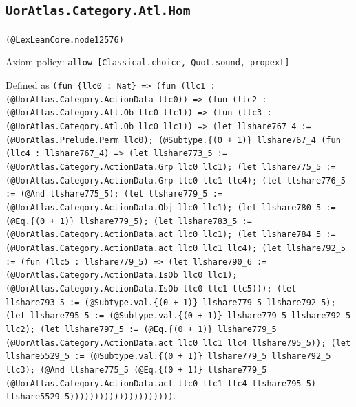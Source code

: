 \documentclass[11pt]{article}
\begin{document}
\subsection*{\texttt{UorAtlas.Category.Atl.Hom}}
\noindent\texttt{(@LexLeanCore.node12576)}\par
\noindent Axiom policy: \texttt{allow [Classical.choice, Quot.sound, propext]}.\par
\noindent Defined as \texttt{(fun \{llc0 : Nat\} => (fun (llc1 : (@UorAtlas.Category.ActionData llc0)) => (fun (llc2 : (@UorAtlas.Category.Atl.Ob llc0 llc1)) => (fun (llc3 : (@UorAtlas.Category.Atl.Ob llc0 llc1)) => (let llshare767\_4 := (@UorAtlas.Prelude.Perm llc0); (@Subtype.\{(0 + 1)\} llshare767\_4 (fun (llc4 : llshare767\_4) => (let llshare773\_5 := (@UorAtlas.Category.ActionData.Grp llc0 llc1); (let llshare775\_5 := (@UorAtlas.Category.ActionData.Grp llc0 llc1 llc4); (let llshare776\_5 := (@And llshare775\_5); (let llshare779\_5 := (@UorAtlas.Category.ActionData.Obj llc0 llc1); (let llshare780\_5 := (@Eq.\{(0 + 1)\} llshare779\_5); (let llshare783\_5 := (@UorAtlas.Category.ActionData.act llc0 llc1); (let llshare784\_5 := (@UorAtlas.Category.ActionData.act llc0 llc1 llc4); (let llshare792\_5 := (fun (llc5 : llshare779\_5) => (let llshare790\_6 := (@UorAtlas.Category.ActionData.IsOb llc0 llc1); (@UorAtlas.Category.ActionData.IsOb llc0 llc1 llc5))); (let llshare793\_5 := (@Subtype.val.\{(0 + 1)\} llshare779\_5 llshare792\_5); (let llshare795\_5 := (@Subtype.val.\{(0 + 1)\} llshare779\_5 llshare792\_5 llc2); (let llshare797\_5 := (@Eq.\{(0 + 1)\} llshare779\_5 (@UorAtlas.Category.ActionData.act llc0 llc1 llc4 llshare795\_5)); (let llshare5529\_5 := (@Subtype.val.\{(0 + 1)\} llshare779\_5 llshare792\_5 llc3); (@And llshare775\_5 (@Eq.\{(0 + 1)\} llshare779\_5 (@UorAtlas.Category.ActionData.act llc0 llc1 llc4 llshare795\_5) llshare5529\_5)))))))))))))))))))))}.\par
\end{document}
